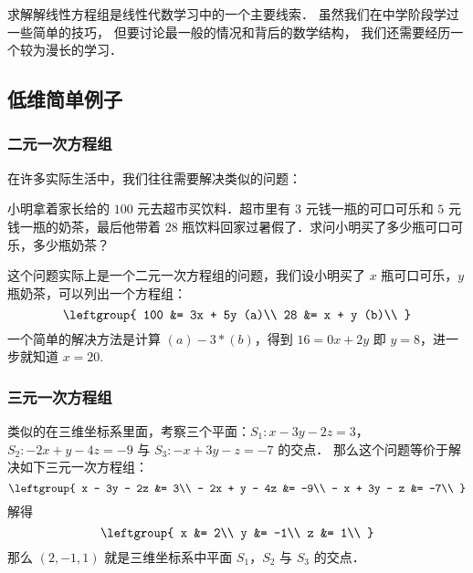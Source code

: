 
求解解线性方程组是线性代数学习中的一个主要线索． 虽然我们在中学阶段学过一些简单的技巧， 但要讨论最一般的情况和背后的数学结构， 我们还需要经历一个较为漫长的学习．

\subsection{低维简单例子}
\subsubsection{二元一次方程组}
在许多实际生活中，我们往往需要解决类似的问题：

小明拿着家长给的 $100$ 元去超市买饮料．超市里有 $3$ 元钱一瓶的可口可乐和 $5$ 元钱一瓶的奶茶，最后他带着 $28$ 瓶饮料回家过暑假了．求问小明买了多少瓶可口可乐，多少瓶奶茶？

这个问题实际上是一个二元一次方程组的问题，我们设小明买了 $x$ 瓶可口可乐，$y$ 瓶奶茶，可以列出一个方程组：\begin{equation}
\leftgroup{
100 &= 3x + 5y (a)\\
28 &= x + y (b)\\
}\end{equation}
一个简单的解决方法是计算 $(a)-3*(b)$，得到 $16 = 0x + 2y$ 即 $y = 8$，进一步就知道 $x = 20$.

\subsubsection{三元一次方程组}
类似的在三维坐标系里面，考察三个平面：$S_1:x - 3y-2z=3$，$S_2:-2x+y-4z=-9$ 与 $S_3:-x+3y-z=-7$ 的交点．
那么这个问题等价于解决如下三元一次方程组：\begin{equation}
\leftgroup{
x - 3y - 2z &= 3\\
- 2x + y - 4z &= -9\\
- x + 3y - z &= -7\\
}\end{equation}
解得\begin{equation}
\leftgroup{
x &= 2\\
y &= -1\\
z &= 1\\
}\end{equation}
那么 $(2,-1,1)$ 就是三维坐标系中平面 $S_1$，$S_2$ 与 $S_3$ 的交点．
